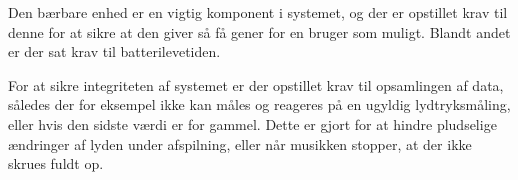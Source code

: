 Den bærbare enhed er en vigtig komponent i systemet, og der er opstillet krav til denne for at sikre at den giver så få gener for en bruger som muligt. Blandt andet er der sat krav til batterilevetiden.

For at sikre integriteten af systemet er der opstillet krav til opsamlingen af data, således der for eksempel ikke kan måles og reageres på en ugyldig lydtryksmåling, eller hvis den sidste værdi er for gammel. Dette er gjort for at hindre pludselige ændringer af lyden under afspilning, eller når musikken stopper, at der ikke skrues fuldt op.


